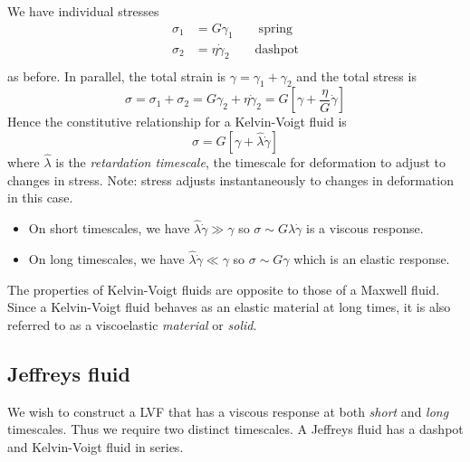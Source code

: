 \documentclass{jknotes}
\newcommand{\srate}{\dot{\gamma}}
\begin{document}
We have individual stresses
\begin{align}
	\sigma_1 &= G \gamma_1 \hspace{2em} \text{spring}\\
	\sigma_2 &= \eta \srate_2 \hspace{2em} \text{dashpot} \\
\end{align}
as before. In parallel, the total strain is $\gamma = \gamma_1 + \gamma_2$ and
the total stress is
\begin{equation}
	\sigma = \sigma_1 + \sigma_2 = G\gamma_2 + \eta \srate_2 = G\left[ \gamma
	+ \frac{\eta}{G} \srate\right]
\end{equation}
Hence the constitutive relationship for a Kelvin-Voigt fluid is
\begin{equation}
	\sigma = G \left[ \gamma + \hat{\lambda}\srate\right]
\end{equation}
where $\hat{\lambda}$ is the \emph{retardation timescale}, the timescale for
deformation to adjust to changes in stress. Note: stress adjusts
instantaneously to changes in deformation in this case.
\begin{itemize}
	\item On short timescales, we have $\hat{\lambda} \srate \gg \gamma$ so $\sigma
		\sim G \hat{\lambda} \srate$ is a viscous response.
	\item On long timescales, we have $\hat{\lambda} \srate \ll \gamma$ so
		$\sigma \sim G \gamma$ which is an elastic response.
\end{itemize}

The properties of Kelvin-Voigt fluids are opposite to those of a Maxwell
fluid. Since a Kelvin-Voigt fluid behaves as an elastic material at long
times, it is also referred to as a viscoelastic \emph{material} or
\emph{solid}.

\subsection{Jeffreys fluid}
We wish to construct a LVF that has a viscous response at both \emph{short}
and \emph{long} timescales. Thus we require two distinct timescales. A
Jeffreys fluid has a dashpot and Kelvin-Voigt fluid in series.
\end{document}
